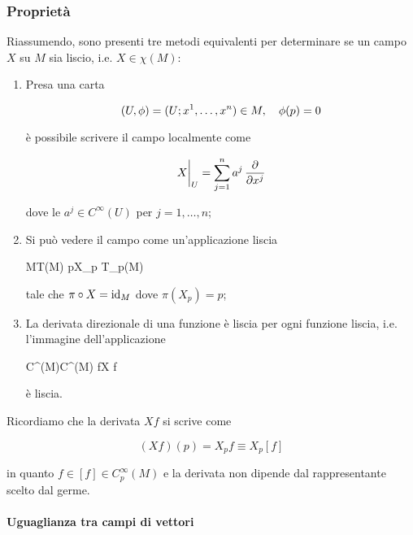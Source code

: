 \subsubsection{Proprietà}

Riassumendo, sono presenti tre metodi equivalenti per determinare se un campo $ X $ su $ M $ sia liscio, i.e. $ X \in \chi(M) $:

\begin{enumerate}
	\item Presa una carta
	
	\begin{equation}
		(U,\phi) = (U; x^{1},\dots,x^{n}) \in M \qcomma \phi(p) = 0
	\end{equation}
	
	è possibile scrivere il campo localmente come
	
	\begin{equation}
		\eval{X}_{U} = \sum_{j=1}^{n} a^{j} \, \pdv{x^{j}}
	\end{equation}

	dove le $ a^{j} \in C^{\infty}(U) $ per $ j=1,\dots,n $;
	
	
	\item Si può vedere il campo come un'applicazione liscia
	
		{M}{T(M)}
		{p}{X_{p} \in T_{p}(M)}
	
	tale che $ \pi \circ X = \operatorname{id}_{M} $ dove $ \pi(X_{p}) = p $;
	
	
	\item La derivata direzionale di una funzione è liscia per ogni funzione liscia, i.e. l'immagine dell'applicazione
	
		{C^{\infty}(M)}{C^{\infty}(M)}
		{f}{X f}

	è liscia.
\end{enumerate}

Ricordiamo che la derivata $ X f $ si scrive come

\begin{equation}
	(X f)(p) = X_{p} f \equiv X_{p} [f]
\end{equation}

in quanto $ f \in [f] \in C_{p}^{\infty}(M) $ e la derivata non dipende dal rappresentante scelto dal germe.

\paragraph{Uguaglianza tra campi di vettori}

